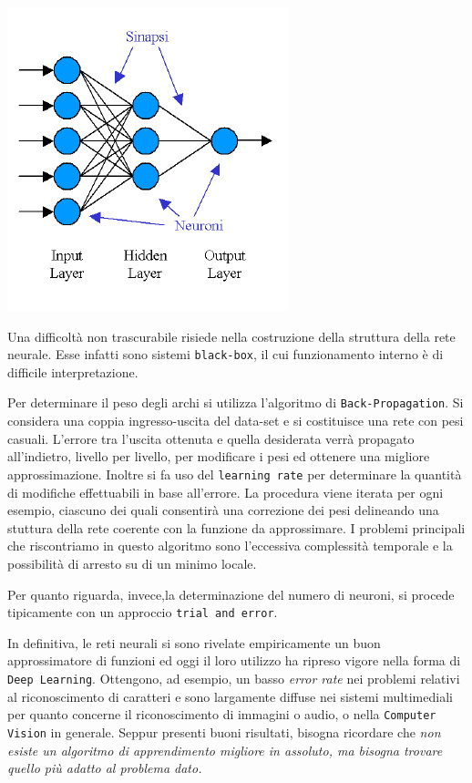 			\begin{center}
				\includegraphics[scale=0.6]{RN-multilayer.jpg}
			\end{center}
			\par
			Una difficoltà non trascurabile risiede nella costruzione della struttura della rete neurale. Esse infatti sono sistemi \texttt{black-box}, il cui funzionamento interno è di difficile interpretazione.\par
			Per determinare il peso degli archi si utilizza l'algoritmo di \texttt{Back-Propagation}. Si considera una coppia ingresso-uscita del data-set e si costituisce una rete con pesi casuali. L'errore tra l'uscita ottenuta e quella desiderata verrà propagato all'indietro, livello per livello, per modificare i pesi ed ottenere una migliore approssimazione. Inoltre si fa uso del \texttt{learning rate} per determinare la quantità di modifiche effettuabili in base all'errore. La procedura viene iterata per ogni esempio, ciascuno dei quali consentirà una correzione dei pesi delineando una stuttura della rete coerente con la funzione da approssimare. I problemi principali che riscontriamo in questo algoritmo sono l'eccessiva complessità temporale e la possibilità di arresto su di un minimo locale.\par
			Per quanto riguarda, invece,la determinazione del numero di neuroni, si procede tipicamente con un approccio \texttt{trial and error}.\par
			In definitiva, le reti neurali si sono rivelate empiricamente un buon approssimatore di funzioni ed oggi il loro utilizzo ha ripreso vigore nella forma di \texttt{Deep Learning}. Ottengono, ad esempio, un basso \emph{error rate} nei problemi relativi al riconoscimento di caratteri e sono largamente diffuse nei sistemi multimediali per quanto concerne il riconoscimento di immagini o audio, o nella \texttt{Computer Vision} in generale. Seppur presenti buoni risultati, bisogna ricordare che \emph{non esiste un algoritmo di apprendimento migliore in assoluto, ma bisogna trovare quello più adatto al problema dato.}
			
